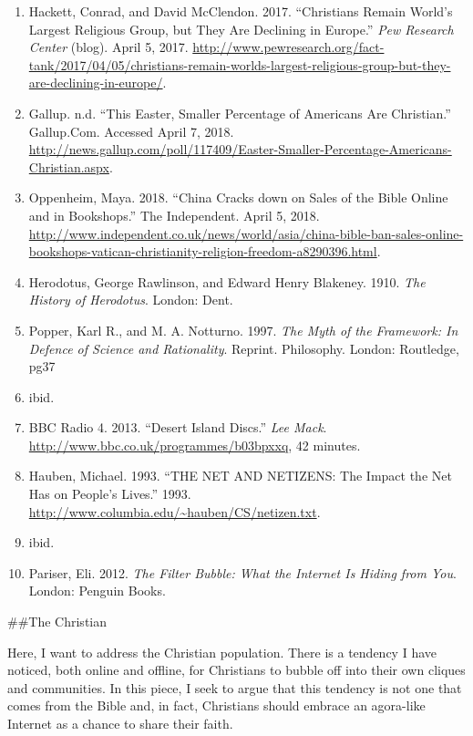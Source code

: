 \documentclass[]{article}
\providecommand{\tightlist}{%
  \setlength{\itemsep}{0pt}\setlength{\parskip}{0pt}}
\begin{document}
\begin{enumerate}
\def\labelenumi{\arabic{enumi}.}
\setcounter{enumi}{1}
\tightlist
\item
  Hackett, Conrad, and David McClendon. 2017. ``Christians Remain
  World's Largest Religious Group, but They Are Declining in Europe.''
  \emph{Pew Research Center} (blog). April 5, 2017.
  \url{http://www.pewresearch.org/fact-tank/2017/04/05/christians-remain-worlds-largest-religious-group-but-they-are-declining-in-europe/}.
\item
  Gallup. n.d. ``This Easter, Smaller Percentage of Americans Are
  Christian.'' Gallup.Com. Accessed April 7, 2018.
  \url{http://news.gallup.com/poll/117409/Easter-Smaller-Percentage-Americans-Christian.aspx}.
\item
  Oppenheim, Maya. 2018. ``China Cracks down on Sales of the Bible
  Online and in Bookshops.'' The Independent. April 5, 2018.
  \url{http://www.independent.co.uk/news/world/asia/china-bible-ban-sales-online-bookshops-vatican-christianity-religion-freedom-a8290396.html}.
\item
  Herodotus, George Rawlinson, and Edward Henry Blakeney. 1910.
  \emph{The History of Herodotus}. London: Dent.
\item
  Popper, Karl R., and M. A. Notturno. 1997. \emph{The Myth of the
  Framework: In Defence of Science and Rationality}. Reprint.
  Philosophy. London: Routledge, pg37
\item
  ibid.
\item
  BBC Radio 4. 2013. ``Desert Island Discs.'' \emph{Lee Mack}.
  \url{http://www.bbc.co.uk/programmes/b03bpxxq}, 42 minutes.
\item
  Hauben, Michael. 1993. ``THE NET AND NETIZENS: The Impact the Net Has
  on People's Lives.'' 1993.
  \url{http://www.columbia.edu/~hauben/CS/netizen.txt}.
\item
  ibid.
\item
  Pariser, Eli. 2012. \emph{The Filter Bubble: What the Internet Is
  Hiding from You}. London: Penguin Books.
\end{enumerate}

\#\#The Christian

Here, I want to address the Christian population. There is a tendency I
have noticed, both online and offline, for Christians to bubble off into
their own cliques and communities. In this piece, I seek to argue that
this tendency is not one that comes from the Bible and, in fact,
Christians should embrace an agora-like Internet as a chance to share
their faith.
\end{document}
